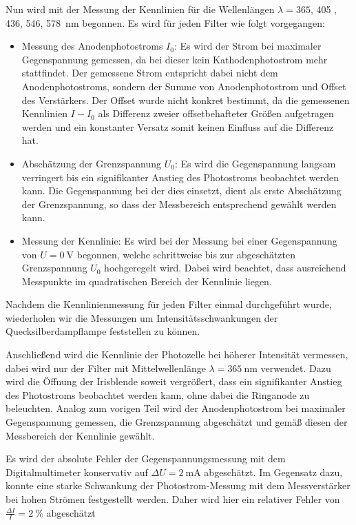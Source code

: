 \documentclass[11pt, a4paper]{article}
\numberwithin{equation}{section}
\begin{document}
Nun wird mit der Messung der Kennlinien für die Wellenlängen $\lambda = \num{365}$, \num{405} , \num{436}, \num{546}, \SI{578}{\nano\metre} begonnen.
Es wird für jeden Filter wie folgt vorgegangen:
\begin{itemize}
  \item Messung des Anodenphotostroms $I_0$: Es wird der Strom bei maximaler Gegenspannung gemessen, da bei dieser kein Kathodenphotostrom mehr stattfindet.
  Der gemessene Strom entspricht dabei nicht dem Anodenphotostroms, sondern der Summe von Anodenphotostrom und Offset des Verstärkers.
  Der Offset wurde nicht konkret bestimmt, da die gemessenen Kennlinien $I-I_0$ als Differenz zweier offsetbehafteter Größen aufgetragen werden und ein konstanter Versatz somit keinen Einfluss auf die Differenz hat. 
  \item Abschätzung der Grenzspannung $U_0$: Es wird die Gegenspannung langsam verringert bis ein signifikanter Anstieg des Photostroms beobachtet werden kann.
  Die Gegenspannung bei der dies einsetzt, dient als erste Abschätzung der Grenzspannung, so dass der Messbereich entsprechend gewählt werden kann.
  \item Messung der Kennlinie: Es wird bei der Messung bei einer Gegenspannung von $U = \SI{0}{\volt}$ begonnen, welche schrittweise bis zur abgeschätzten Grenzspannung $U_0$ hochgeregelt wird. Dabei wird beachtet, dass ausreichend Messpunkte im quadratischen Bereich der Kennlinie liegen.
\end{itemize}
Nachdem die Kennlinienmessung für jeden Filter einmal durchgeführt wurde, wiederholen wir die Messungen um Intensitätsschwankungen der Quecksilberdampflampe feststellen zu können.

Anschließend wird die Kennlinie der Photozelle bei höherer Intensität vermessen, dabei wird nur der Filter mit Mittelwellenlänge $\lambda = \SI{365}{\nano\metre}$ verwendet.
Dazu wird die Öffnung der Irisblende soweit vergrößert, dass ein signifikanter Anstieg des Photostroms beobachtet werden kann, ohne dabei die Ringanode zu beleuchten.
Analog zum vorigen Teil wird der Anodenphotostrom bei maximaler Gegenspannung gemessen, die Grenzspannung abgeschätzt und gemäß diesen der Messbereich der Kennlinie gewählt.

Es wird der absolute Fehler der Gegenspannungsmessung mit dem Digitalmultimeter konservativ auf $\Delta U = \SI{2}{\milli\ampere}$ abgeschätzt.
Im Gegensatz dazu, konnte eine starke Schwankung der Photostrom-Messung mit dem Messverstärker bei hohen Strömen festgestellt werden.
Daher wird hier ein relativer Fehler von $\frac{\Delta I}{I} = \SI{2}{\percent}$ abgeschätzt
\end{document}
